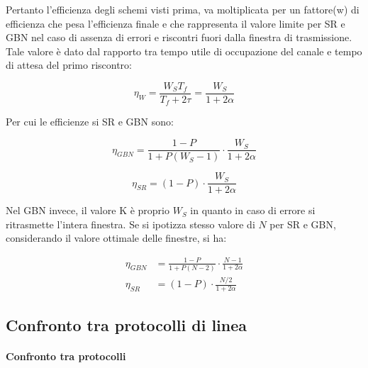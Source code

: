 Pertanto l'efficienza degli schemi visti prima, va moltiplicata
per un fattore(w) di efficienza che pesa l'efficienza finale e che
rappresenta il valore limite per SR e GBN nel caso di
assenza di errori e riscontri fuori dalla finestra di
trasmissione. Tale valore è dato dal rapporto tra tempo utile
di occupazione del canale e tempo di attesa del primo
riscontro:

\begin{equation}
\eta_W = \frac{W_S T_f}{T_f + 2\tau} = \frac{W_S}{1 + 2\alpha}
\end{equation}

Per cui le efficienze si SR e GBN sono:

\begin{center}
\begin{minipage}{0.45\textwidth}
    \begin{equation*}
        \eta_{GBN} = \frac{1-P}{1 + P(W_S - 1)} \cdot \frac{W_S}{1 + 2\alpha}
    \end{equation*}
\end{minipage}
\hfill
\begin{minipage}{0.45\textwidth}
    \begin{equation*}
        \eta_{SR} = (1-P) \cdot \frac{W_S}{1 + 2\alpha}
    \end{equation*}
\end{minipage}
\end{center}
Nel GBN invece, il valore K è proprio $W_S$ in quanto in caso di errore si ritrasmette l'intera finestra.
Se si ipotizza stesso valore di $N$ per SR e GBN, considerando il valore ottimale delle finestre, si ha:

\begin{align*}
    \eta_{GBN} &= \frac{1-P}{1 + P(N-2)} \cdot \frac{N-1}{1 + 2\alpha} \\
    \eta_{SR}  &= (1-P) \cdot \frac{N/2}{1 + 2\alpha}
\end{align*}

\newpage

\subsection{Confronto tra protocolli di linea}
\paragraph{Confronto tra protocolli}


